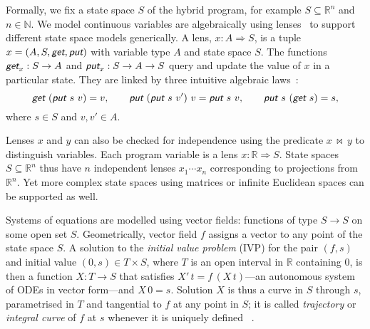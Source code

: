 \documentclass[envcountsame,envcountsect]{llncs}
\newcommand{\reals}{\mathbb{R}}
\newcommand{\lput}{\textit{\textsf{put}}}
\newcommand{\lget}{\textit{\textsf{get}}}
\newcommand{\lto}{\Longrightarrow}
\newcommand{\lindep}{\mathop{\,\bowtie\,}}
\begin{document}
Formally, we fix a state space $S$ of the hybrid program, for example
$S\subseteq \reals^n$ and $n\in\mathbb{N}$. We model continuous
variables are algebraically using lenses~\cite{FosterZW16} to support
different state space models generically. A lens, $x : A \lto S$, is a
tuple $x = (A, S, \lget, \lput)$ with variable type $A$ and state
space $S$. The functions $\lget_x : S \to A$ and
$\lput_x : S \to A \to S$ query and update the value of $x$ in a
particular state. They are linked by three intuitive algebraic
laws~\cite{FosterZW16}:
\begin{equation*}
\lget~(\lput~s~v) = v, \qquad \lput~(\lput~s~v')~v = \lput~s~v, \qquad
\lput~s~(\lget~s) = s,
\end{equation*}
where $s \in S$ and $v, v' \in A$.

Lenses $x$ and $y$ can also be checked for independence using the
predicate $x \lindep y$ to distinguish variables. Each program
variable is a lens $x : \reals \lto S$. State spaces
$S \subseteq \reals^n$ thus have $n$ independent lenses
$x_1 \cdots x_n$ corresponding to projections from $\reals^n$. Yet
more complex state spaces using matrices or infinite Euclidean
spaces can be supported as well.

Systems of equations are modelled using vector fields: functions of
type $S\to S$ on some open set $S$. Geometrically, vector field $f$
assigns a vector to any point of the state space $S$. A solution to
the \emph{initial value problem} (IVP) for the pair $(f,s)$ and
initial value $(0,s)\in T\times S$, where $T$ is an open interval in
$\reals$ containing $0$, is then a function $X:T\to S$ that satisfies
$X'\, t = f\, (X\, t)$---an autonomous system of ODEs in vector
form---and $X\, 0 = s$. Solution $X$ is thus a curve in $S$ through
$s$, parametrised in $T$ and tangential to $f$ at any point in $S$; it
is called \emph{trajectory} or \emph{integral curve} of $f$ at $s$
whenever it is uniquely defined ~\cite{Teschl12}.
\end{document}
